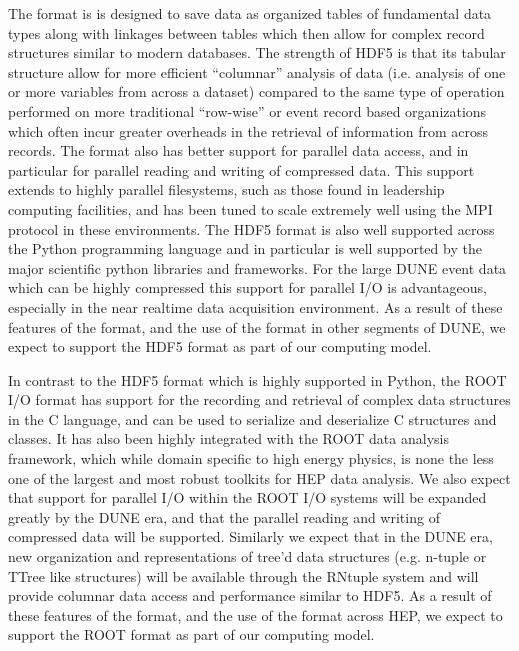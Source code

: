 \documentclass[../main-v1.tex]{subfiles}
\begin{document}
The  format is is designed to save data as organized tables of fundamental data types along with linkages between tables which then allow for complex record structures similar to modern databases.  The strength of HDF5 is that its tabular structure allow for more efficient ``columnar'' analysis of data (i.e. analysis of one or more variables from across a dataset) compared to the same type of operation performed on more traditional ``row-wise'' or event record based organizations which often incur greater overheads in the retrieval of information from across records.  The format also has better support for parallel data access, and in particular for parallel reading and writing of compressed data.  This support extends to highly parallel filesystems, such as those found in leadership computing facilities, and has been tuned to scale extremely well using the MPI protocol in these environments.  The HDF5 format is also well supported across the Python programming language and in particular is well supported by the major scientific python libraries and frameworks.  For the large DUNE event data which can be highly compressed this support for parallel I/O is advantageous, especially in the near realtime data acquisition environment.  As a result of these features of the format, and the use of the format in other segments of DUNE, we expect to support the HDF5 format as part of our computing model.

In contrast to the HDF5 format which is highly supported in Python, the ROOT I/O format has support for the recording and retrieval of complex data structures in the  C\raisebox{1pt}{++} language, and can be used to serialize and deserialize  C\raisebox{1pt}{++} structures and classes.  It has also been highly integrated with the ROOT data analysis framework, which while domain specific to high energy physics, is none the less one of the largest and most robust toolkits for HEP data analysis.  We also expect that support for parallel I/O within the ROOT I/O systems will be expanded greatly by the DUNE era, and that the parallel reading and writing of compressed data will be supported.  Similarly we expect that in the DUNE era, new organization and representations of tree'd data structures (e.g. n-tuple or TTree like structures) will be available through the RNtuple system and will provide columnar data access and performance similar to HDF5.  As a result of these features of the format, and the use of the format across HEP, we expect to support the ROOT format as part of our computing model. 
\end{document}

